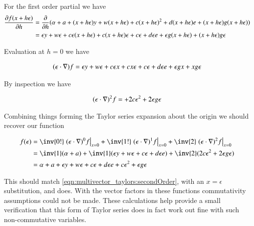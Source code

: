 For the first order partial we have
\begin{align*}
\PD{h}{f(x + h \epsilon)} 
&= \PD{h}{} ( \alpha + a + (x + h\epsilon) y + w (x + h\epsilon) + c (x + h\epsilon)^2 + d (x + h\epsilon) e + (x + h\epsilon) g (x + h\epsilon) ) \\
&= 
\epsilon y 
+ w \epsilon
+ c \epsilon (x + h\epsilon) 
+ c (x + h\epsilon) \epsilon
+ c \epsilon 
+ d \epsilon e 
+ \epsilon g (x + h\epsilon) 
+ (x + h\epsilon) g \epsilon \\
\end{align*}

Evaluation at $h=0$ we have

\begin{align*}
(\epsilon \cdot \grad) f
&=
\epsilon y 
+ w \epsilon
+ c \epsilon x 
+ c x \epsilon
+ c \epsilon 
+ d \epsilon e 
+ \epsilon g x 
+ x g \epsilon \\
\end{align*}

By inspection we have

\begin{align*}
(\epsilon \cdot \grad)^2 f
&=
+ 2 c \epsilon^2
+ 2 \epsilon g \epsilon \\
\end{align*}

Combining things forming the Taylor series expansion about the origin we should recover our function

\begin{align*}
f(\epsilon) 
&= \inv{0!} \left. (\epsilon \cdot \grad)^0 f \right\vert_{x=0} 
+ \inv{1!} \left. (\epsilon \cdot \grad)^1 f \right\vert_{x=0} 
+ \inv{2} \left. (\epsilon \cdot \grad)^2 f \right\vert_{x=0} \\
&= \inv{1} (\alpha + a) + \inv{1} (\epsilon y + w \epsilon + c \epsilon + d \epsilon e ) + \inv{2}(2 c \epsilon^2 + 2 \epsilon g \epsilon ) \\
&= \alpha + a + \epsilon y + w \epsilon + c \epsilon + d \epsilon e + c \epsilon^2 + \epsilon g \epsilon \\
\end{align*}

This should match \ref{eqn:multivector_taylors:secondOrder}, with an $x = \epsilon$ substitution, and does.  With the vector factors in these functions commutativity 
assumptions could not be made.  These calculations 
help provide a small verification that this form
of Taylor series does in fact work out fine with such non-commutative variables.

